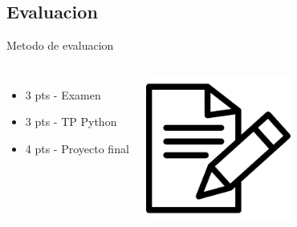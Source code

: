  \subsection{Evaluacion}
 \begin{frame}{Metodo de evaluacion}{}
    \begin{columns}[onlytextwidth]
       \begin{itemize}
          \item  3 pts - Examen
          \item  3 pts - TP Python
          \item  4 pts - Proyecto final
       \end{itemize}
       \center\includegraphics[width=0.8\textwidth]{1_clase/exam_icon}
    \end{columns}
    \vfill
 \end{frame}
